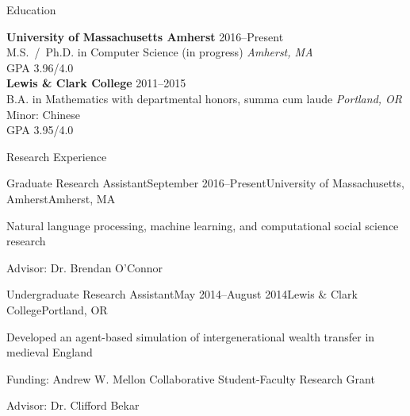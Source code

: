 \documentclass{resume} %
\begin{document}
%


\begin{rSection}{Education}

{\bf University of Massachusetts Amherst} \hfill {2016--Present} \\ 
M.S.~/~Ph.D. in Computer Science (in progress) \hfill {\em Amherst, MA} \\
GPA 3.96/4.0 \\

{\bf Lewis \& Clark College} \hfill {2011--2015} \\ 
B.A. in Mathematics with departmental honors, summa cum laude \hfill {\em Portland, OR} \\
Minor: Chinese \\
GPA 3.95/4.0 \\
\end{rSection}


\begin{rSection}{Research Experience}

\begin{rSubsection}{Graduate Research Assistant}{September 2016--Present}{University of Massachusetts, Amherst}{Amherst, MA}
\item Natural language processing, machine learning, and computational social science research
\item Advisor: Dr. Brendan O'Connor 
\end{rSubsection}


\begin{rSubsection}{Undergraduate Research Assistant}{May 2014--August 2014}{Lewis \& Clark College}{Portland, OR}
\item Developed an agent-based simulation of intergenerational wealth transfer in medieval England
\item Funding: Andrew W. Mellon Collaborative Student-Faculty Research Grant
\item Advisor: Dr. Clifford Bekar
\end{rSubsection}

\end{rSection}
\end{document}
